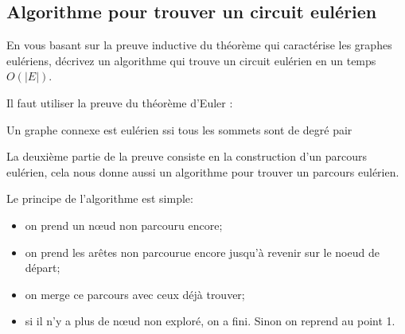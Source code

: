 \subsection{Algorithme pour trouver un circuit eulérien} En vous basant sur la preuve inductive du théorème qui caractérise les graphes eulériens, décrivez un algorithme qui trouve un circuit eulérien en un temps $O(|E|)$.
\begin{solution}
Il faut utiliser la preuve du théorème d'Euler :

\begin{center}
Un graphe connexe est eulérien ssi tous les sommets sont de degré
pair
\par\end{center}

La deuxième partie de la preuve consiste en la construction d'un parcours
eulérien, cela nous donne aussi un algorithme pour trouver un parcours
eulérien.

Le principe de l’algorithme est simple:
\begin{itemize}
\item on prend un nœud non parcouru encore;
\item on prend les arêtes non parcourue encore jusqu'à revenir sur le noeud de départ;
\item on merge ce parcours avec ceux déjà trouver;
\item si il n'y a plus de nœud non exploré, on a fini. Sinon on reprend au point 1.
\end{itemize}
\end{solution}
